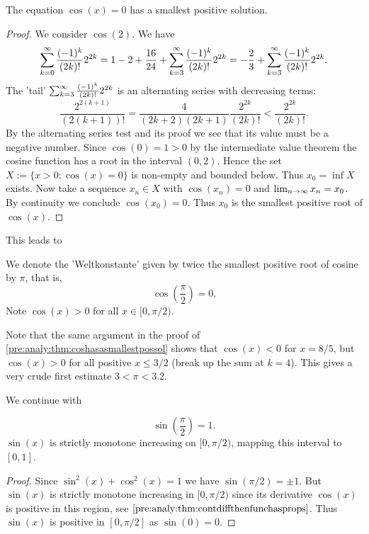 \documentclass[10pt, a4paper]{article}
\newcommand{\infsumo}{\infsum[k = 0]}
\begin{document}
\begin{theorem}\label{pre:analy:thm:coshasasmallestpossol}
    The equation $\cos(x) = 0$ has a smallest positive solution.
    \begin{proof}
        We consider $\cos(2)$.
        We have
        \[
        \infsumo\frac{(-1) ^ k}{(2k)!}2 ^ {2k} = 1 - 2 + \frac{16}{24} + \infsum[k = 3]\frac{(-1) ^ k}{(2k)!}2 ^ {2k} = -\frac{2}{3} + \infsum[k = 3]\frac{(-1) ^ k}{(2k)!}2 ^ {2k}.
        \]
        The 'tail' $\infsum[k = 3]\frac{(-1) ^ k}{(2k)!}2 ^ {2k}$ is an alternating series with decreasing terms:
        \[
        \frac{2 ^ {2(k + 1)}}{(2(k + 1))!} = \frac{4}{(2k + 2)(2k + 1)}\frac{2 ^ {2k}}{(2k)!} < \frac{2 ^ {2k}}{(2k)!}.
        \]
        By the alternating series test and its proof we see that its value must be a negative number.
        Since $\cos(0) = 1 > 0$ by the intermediate value theorem the cosine function has a root in the interval $(0, 2)$.
        Hence the set $X := \{x > 0; \cos(x) = 0\}$ is non-empty and bounded below.
        Thus $x_0 = \inf{X}$ exists.
        Now take a sequence $x_n \in X$ with $\cos(x_n) = 0$ and $\liminfty x_n = x_0$.
        By continuity we conclude $\cos(x_0) = 0$.
        Thus $x_0$ is the smallest positive root of $\cos(x)$.
    \end{proof}
\end{theorem}

This leads to
\begin{definition}
    We denote the 'Weltkonstante' given by twice the smallest positive root of cosine by $\pi$,
    that is,
    \[
    \cos\left(\frac{\pi}{2}\right) = 0.
    \]
    Note $\cos(x) > 0$ for all $x \in [0, \pi / 2)$.
\end{definition}

Note that the same argument in the proof of \autoref{pre:analy:thm:coshasasmallestpossol} shows that $\cos(x) < 0$ for $x = 8 / 5$,
but $\cos(x) > 0$ for all positive $x \leq 3 / 2$
(break up the sum at $k = 4$).
This gives a very crude first estimate $3 < \pi < 3.2$.

We continue with
\begin{theorem}
    \[
    \sin\left(\frac{\pi}{2}\right) = 1.
    \]
    $\sin(x)$ is strictly monotone increasing on $[0, \pi / 2)$,
    mapping this interval to $[0, 1]$.
    \begin{proof}
        Since $\sin ^ 2(x) + \cos ^ 2(x) = 1$ we have $\sin(\pi / 2) = \pm 1$.
        But $\sin(x)$ is strictly monotone increasing in $[0, \pi / 2)$ since its derivative $\cos(x)$ is positive in this region,
        see $\autoref{pre:analy:thm:contdiffthenfunchasprops}$.
        Thus $\sin(x)$ is positive in $[0, \pi / 2]$ as $\sin(0) = 0$.
    \end{proof}
\end{theorem}
\end{document}
